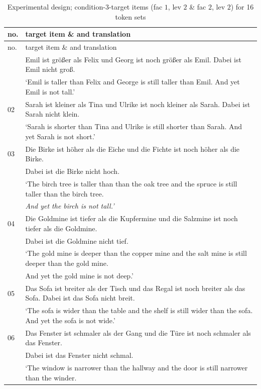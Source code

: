 \documentclass[output=paper,
modfonts
]{langscibook}
\begin{document}
\begin{longtable}{lp{317.90625pt}}
\caption{Experimental design; condition-3-target items (fac $1$, lev $2$ \& fac $2$, lev $2$) for 16 token sets\label{tab:16_contexts}}\\
\lsptoprule no. & target item \& and translation\\\midrule\endfirsthead\midrule no. & target item \& and translation\\\midrule\endhead\endfoot\lspbottomrule\endlastfoot
01 & Emil ist größer als Felix und Georg ist noch größer als Emil. Dabei ist Emil nicht groß. \\
   & {`Emil is taller than Felix and George is still taller than Emil. And yet Emil is not tall.'}\\
\midrule
02 & Sarah ist kleiner als Tina und Ulrike ist noch kleiner als Sarah. Dabei ist Sarah nicht klein.\\
   & {`Sarah is shorter than Tina and Ulrike is still shorter than Sarah. And yet Sarah is not short.'}\\
\midrule 
03 & Die Birke ist höher als die Eiche und die Fichte ist noch höher als die Birke. \\
   & Dabei ist die Birke nicht hoch.\\
   & {`The birch tree is taller than than the oak tree and the spruce is still taller than the birch tree.}\\
   & \textit{And yet the birch is not tall.'}\\
\midrule
04 & Die Goldmine ist tiefer als die Kupfermine und die Salzmine ist noch tiefer als die Goldmine. \\
   & Dabei ist die Goldmine nicht tief. \\
   & {`The gold mine is deeper than the copper mine and the salt mine is still deeper than the gold mine.} \\
   & {And yet the gold mine is not deep.'}\\
\midrule
05 & Das Sofa ist breiter als der Tisch und das Regal ist noch breiter als das Sofa. Dabei ist das Sofa nicht breit.\\
   & {`The sofa is wider than the table and the shelf is still wider than the sofa. And yet the sofa is not wide.'}\\
\midrule
06 & Das Fenster ist schmaler als der Gang und die Türe ist noch schmaler als das Fenster.\\
   & Dabei ist das Fenster nicht schmal.\\
   & {`The window is narrower than the hallway and the door is still narrower than the winder.} \\

\end{longtable}
\end{document}

